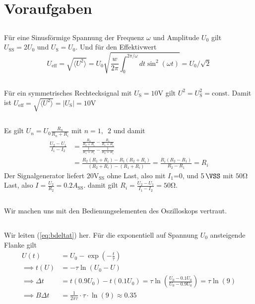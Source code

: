 \documentclass{article}
\newcommand{\subsectionAlph}{ \renewcommand{\thesubsection}{\arabic{section}.\Alph{subsection}} }
\begin{document}
\section{Voraufgaben}
\begingroup
\subsectionAlph
\subsection{}
Für eine Sinusförmige Spannung der Frequenz $\omega$ und Amplitude $U_0$ gilt $U_\text{SS} = 2U_0$ und $U_\text{S} = U_0$.
Und für den Effektivwert
\begin{equation}
  U_\text{eff} = \sqrt{\langle U^2 \rangle} = U_0 \sqrt{\frac{w}{2\pi} \int_0^{2\pi/\omega} dt \sin^2(\omega t)} = U_0/\sqrt{2}
\end{equation}

\subsection{}
Für ein symmetrisches Rechtecksignal mit $U_\text{S} = 10\text{V}$ gilt $U^2 = U_\text{S}^2 = \text{const.}$
Damit ist $U_\text{eff} = \sqrt{\langle U^2 \rangle} = \lvert U_\text{S} \rvert = 10\text{V}$

\subsection{}
Es gilt $U_n = U_0 \frac{R_n}{R_n+R_i}$ mit $n=1,\enspace 2$ und damit
\begin{align}
  \frac{U_2 - U_1}{I_1 - I_2} &= \frac{ \frac{R_2}{R_2+R_i} - \frac{R_1}{R_1+R_i}}{ \frac{1}{R_1+R_i} - \frac{1}{R_2+R_i} } \nonumber \\ 
  &= \frac{ R_2(R_1+R_i) - R_1(R_2+R_i) }{ (R_2+R_i) - (R_1+R_i) } = \frac{R_i(R_2-R_1)}{R_2-R_1} = R_i
\end{align}
Der Signalgenerator liefert $20\text{V}_\text{SS}$ ohne Last, also mit $I_1$=0, und $\SI{5}{\VSS}$ mit $50\mathrm{\Omega}$ Last,
also $I = \frac{U_2}{R_2} = 0.2A_\text{SS}$. damit gilt $R_i = \frac{U_2 - U_1}{I_1 - I_2} = 50\mathrm{\Omega}$.

\subsection{}
Wir machen uns mit den Bedienungselementen des Oszilloskops vertraut.

\subsection{}
Wir leiten (\ref{eq:bdeltat}) her. Für die exponentiell auf Spannung $U_0$ ansteigende Flanke gilt
\begin{align*}
  U(t) &= U_0 - \exp(-\frac{t}{\tau}) \\
  \implies t(U) &= -\tau \ln(U_0 - U) \\
  \implies \Delta t &= t(0.9 U_0) - t(0.1 U_0) = \tau \ln(\frac{U_0-0.1U_0}{U_0-0.9U_0}) = \tau \ln(9) \\
  \implies B \Delta t &= \frac{1}{2\pi\tau} \cdot \tau \cdot \ln(9) \approx 0.35
\end{align*}
\end{document}
